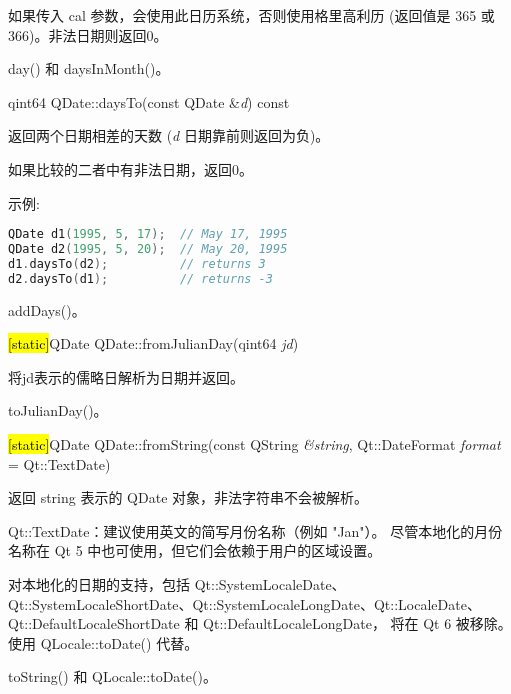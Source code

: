 如果传入 cal 参数，会使用此日历系统，否则使用格里高利历 (返回值是 365 或 366)。非法日期则返回0。



\begin{notice}[另请参阅]
day() 和 daysInMonth()。
\end{notice}

\splitLine

qint64 QDate::daysTo(const QDate \&\emph{d}) const

返回两个日期相差的天数 (\emph{d} 日期靠前则返回为负)。

如果比较的二者中有非法日期，返回0。

示例:

\begin{lstlisting}[language=C++]
QDate d1(1995, 5, 17);  // May 17, 1995
QDate d2(1995, 5, 20);  // May 20, 1995
d1.daysTo(d2);          // returns 3
d2.daysTo(d1);          // returns -3
\end{lstlisting}


\begin{notice}[另请参阅]
addDays()。
\end{notice}

\splitLine

\hl{[static]}QDate QDate::fromJulianDay(qint64 \emph{jd})

将jd表示的儒略日解析为日期并返回。


\begin{notice}[另请参阅]
toJulianDay()。
\end{notice}


\splitLine

\hl{[static]}QDate QDate::fromString(const QString \emph{\&string},
Qt::DateFormat \emph{format} = Qt::TextDate)

返回 string 表示的 QDate 对象，非法字符串不会被解析。

\begin{notice}
Qt::TextDate：建议使用英文的简写月份名称（例如 "Jan"）。
尽管本地化的月份名称在 Qt 5 中也可使用，但它们会依赖于用户的区域设置。
\end{notice}

\begin{notice}
对本地化的日期的支持，包括 Qt::SystemLocaleDate、Qt::SystemLocaleShortDate、Qt::SystemLocaleLongDate、Qt::LocaleDate、Qt::DefaultLocaleShortDate 和 Qt::DefaultLocaleLongDate，
将在 Qt 6 被移除。使用 QLocale::toDate() 代替。
\end{notice} 

\begin{notice}[另请参阅]
toString() 和 QLocale::toDate()。
\end{notice}

